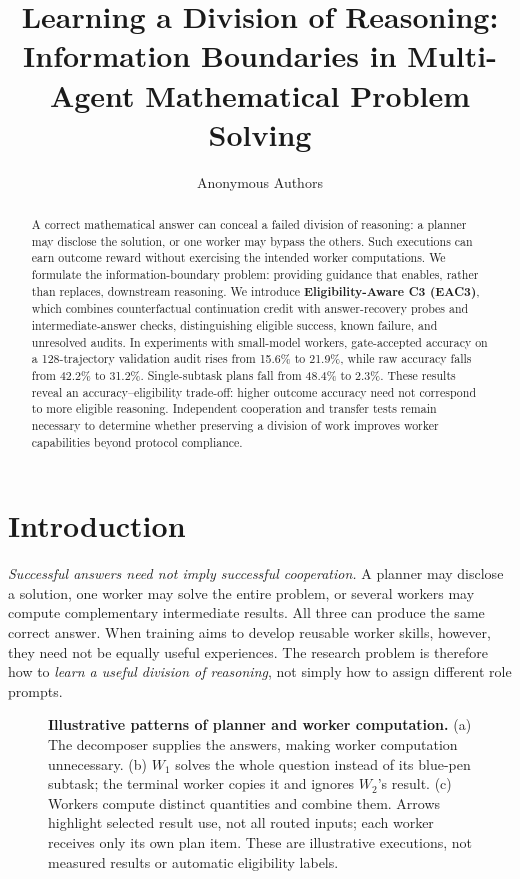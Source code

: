 \documentclass[11pt]{article}
\title{Learning a Division of Reasoning:\\Information Boundaries in Multi-Agent Mathematical Problem Solving}
\author{Anonymous Authors}
\begin{document}
\maketitle

\begin{abstract}
A correct mathematical answer can conceal a failed division of reasoning: a planner may disclose the solution, or one worker may bypass the others. Such executions can earn outcome reward without exercising the intended worker computations. We formulate the information-boundary problem: providing guidance that enables, rather than replaces, downstream reasoning. We introduce \textbf{Eligibility-Aware C3 (EAC3)}, which combines counterfactual continuation credit with answer-recovery probes and intermediate-answer checks, distinguishing eligible success, known failure, and unresolved audits. In experiments with small-model workers, gate-accepted accuracy on a 128-trajectory validation audit rises from 15.6\% to 21.9\%, while raw accuracy falls from 42.2\% to 31.2\%. Single-subtask plans fall from 48.4\% to 2.3\%. These results reveal an accuracy--eligibility trade-off: higher outcome accuracy need not correspond to more eligible reasoning. Independent cooperation and transfer tests remain necessary to determine whether preserving a division of work improves worker capabilities beyond protocol compliance.
\end{abstract}

\section{Introduction}
\emph{Successful answers need not imply successful cooperation.} A planner may disclose a solution, one worker may solve the entire problem, or several workers may compute complementary intermediate results. All three can produce the same correct answer. When training aims to develop reusable worker skills, however, they need not be equally useful experiences. The research problem is therefore how to \emph{learn a useful division of reasoning}, not simply how to assign different role prompts.

\begin{figure}[t]
\centering
\resizebox{\textwidth}{!}{}
\caption{\textbf{Illustrative patterns of planner and worker computation.} (a) The decomposer supplies the answers, making worker computation unnecessary. (b) $W_1$ solves the whole question instead of its blue-pen subtask; the terminal worker copies it and ignores $W_2$'s result. (c) Workers compute distinct quantities and combine them. Arrows highlight selected result use, not all routed inputs; each worker receives only its own plan item. These are illustrative executions, not measured results or automatic eligibility labels.}
\label{fig:problem}
\end{figure}
\end{document}
